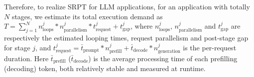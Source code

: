 Therefore, to realize SRPT for LLM applications, for an application with totally $N$ stages, we estimate its total execution demand as
$T = \sum_{j=1}^N n^j_\text{loops} * n^j_\text{parallelism} * t^j_\text{request} + t^j_\text{gap}$,
where $n^j_\text{loops}$, $n^j_\text{parallelism}$ and $t^j_\text{gap}$ are respectively the estimated looping times, request parallelism and post-stage gap for stage $j$, and  $t^j_\text{request} = \bar{t}_\text{prompt} * n^j_\text{prefill} + \bar{t}_\text{decode} * n^j_\text{generation}$ is the per-request duration.
Here $\bar{t}_\text{prefill}$ ($\bar{t}_\text{decode}$) is the average processing time of each prefilling (decoding) token, both relatively stable and measured at runtime. 



